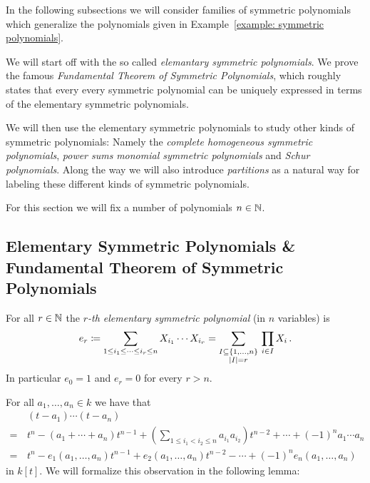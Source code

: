 \begin{fluff}
  In the following subsections we will consider families of symmetric polynomials which generalize the polynomials given in Example~\ref{example: symmetric polynomials}.
  
  We will start off with the so called \emph{elemantary symmetric polynomials}.
  We prove the famous \emph{Fundamental Theorem of Symmetric Polynomials}, which roughly states that every every symmetric polynomial can be uniquely expressed in terms of the elementary symmetric polynomials.
  
  We will then use the elementary symmetric polynomials to study other kinds of symmetric polynomials:
  Namely the \emph{complete homogeneous symmetric polynomials}, \emph{power sums} \emph{monomial symmetric polynomials} and \emph{Schur polynomials}.
  Along the way we will also introduce \emph{partitions} as a natural way for labeling these different kinds of symmetric polynomials.
\end{fluff}


\begin{notation}
  For this section we will fix a number of polynomials $n \in \mathbb{N}$.
\end{notation}





\subsection{Elementary Symmetric Polynomials \& Fundamental Theorem of Symmetric Polynomials}


\begin{definition}
  For all $r \in \mathbb{N}$ the \emph{$r$-th elementary symmetric polynomial} (in $n$ variables) is
  \[
              e_r
    \coloneqq  \sum_{1 \leq i_1 \leq \dotsb \leq i_r \leq n} X_{i_1} \dotsm X_{i_r}
    =         \sum_{\substack{I \subseteq \{1, \dotsc, n\} \\ |I| = r}} \, \prod_{i \in I} X_i \,.
  \]
  In particular $e_0 = 1$ and $e_r = 0$ for every $r > n$.
\end{definition}


\begin{fluff}
  For all $a_1, \dotsc, a_n \in k$ we have that
  \begin{align*}
     &\, (t-a_1) \dotsm (t-a_n) \\
    =&\, t^n  - (a_1 + \dotsb + a_n) t^{n-1}
              + \left( \sum_{1 \leq i_1 < i_2 \leq n} a_{i_1} a_{i_2} \right) t^{n-2}
              + \dotsb
              + (-1)^n a_1 \dotsm a_n \\ 
    =&\,    t^n
          - e_1(a_1, \dotsc, a_n) t^{n-1}
          + e_2(a_1, \dotsc, a_n) t^{n-2}
          - \dotsb
          + (-1)^n e_n(a_1, \dotsc, a_n)
  \end{align*}
  in $k[t]$.
  We will formalize this observation in the following lemma:
\end{fluff}


